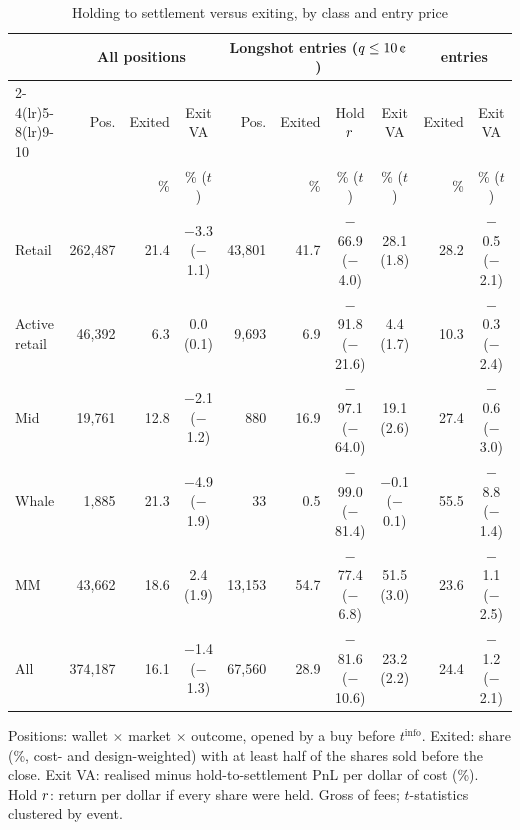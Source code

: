 \begin{table}[t]
\centering
\small
\begin{threeparttable}
\caption{Holding to settlement versus exiting, by class and entry price}\label{tab:wallets-holdexit}
\footnotesize
\setlength{\tabcolsep}{4pt}
\begin{tabular}{lrrcrrccrc}
\toprule
& \multicolumn{3}{c}{All positions} & \multicolumn{4}{c}{Longshot entries ($\q\le10\cents$)} & \multicolumn{2}{c}{\FAV{} entries} \\
\cmidrule(lr){2-4}\cmidrule(lr){5-8}\cmidrule(lr){9-10}
& Pos. & Exited & Exit VA & Pos. & Exited & Hold $r$ & Exit VA & Exited & Exit VA \\
& & \% & \% ($t$) & & \% & \% ($t$) & \% ($t$) & \% & \% ($t$) \\
\midrule
Retail & 262{,}487 & 21.4 & $-$3.3 ($-$1.1) & 43{,}801 & 41.7 & $-$66.9 ($-$4.0) & 28.1 (1.8) & 28.2 & $-$0.5 ($-$2.1) \\
Active retail & 46{,}392 & 6.3 & 0.0 (0.1) & 9{,}693 & 6.9 & $-$91.8 ($-$21.6) & 4.4 (1.7) & 10.3 & $-$0.3 ($-$2.4) \\
Mid & 19{,}761 & 12.8 & $-$2.1 ($-$1.2) & 880 & 16.9 & $-$97.1 ($-$64.0) & 19.1 (2.6) & 27.4 & $-$0.6 ($-$3.0) \\
Whale & 1{,}885 & 21.3 & $-$4.9 ($-$1.9) & 33 & 0.5 & $-$99.0 ($-$81.4) & $-$0.1 ($-$0.1) & 55.5 & $-$8.8 ($-$1.4) \\
MM & 43{,}662 & 18.6 & 2.4 (1.9) & 13{,}153 & 54.7 & $-$77.4 ($-$6.8) & 51.5 (3.0) & 23.6 & $-$1.1 ($-$2.5) \\
\addlinespace
All & 374{,}187 & 16.1 & $-$1.4 ($-$1.3) & 67{,}560 & 28.9 & $-$81.6 ($-$10.6) & 23.2 (2.2) & 24.4 & $-$1.2 ($-$2.1) \\
\bottomrule
\end{tabular}
\begin{tablenotes}\footnotesize
\item Positions: wallet $\times$ market $\times$ outcome, opened by a buy before $t^{\mathrm{info}}$. Exited: share (\%, cost-
  and design-weighted) with at least half of the shares sold before the close. Exit VA: realised minus
  hold-to-settlement PnL per dollar of cost (\%). Hold $r$: return per dollar if every share were held.
  Gross of fees; $t$-statistics clustered by event.
\end{tablenotes}
\end{threeparttable}
\end{table}
